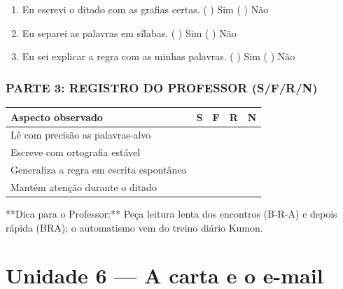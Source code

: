 \begin{exercicio}
\begin{enumerate}[label=\alph*)]
  \item Eu escrevi o ditado com as grafias certas.  \quad ( ) Sim   ( ) Não

  \item Eu separei as palavras em sílabas.  \quad ( ) Sim   ( ) Não

  \item Eu sei explicar a regra com as minhas palavras.  \quad ( ) Sim   ( ) Não

\end{enumerate}

\subsection*{PARTE 3: REGISTRO DO PROFESSOR (S/F/R/N)}

\begin{center}
\renewcommand{\arraystretch}{1.4}
\begin{tabular}{@{}p{9cm}cccc@{}}
\toprule
Aspecto observado & S & F & R & N \\
\midrule
Lê com precisão as palavras-alvo & & & & \\
Escreve com ortografia estável & & & & \\
Generaliza a regra em escrita espontânea & & & & \\
Mantém atenção durante o ditado & & & & \\
\bottomrule\end{tabular}\end{center}

\end{exercicio}

\begin{dica}
**Dica para o Professor:** Peça leitura lenta dos encontros (B-R-A) e depois rápida (BRA); o automatismo vem do treino diário Kumon.
\end{dica}



\chapter{Unidade 6 --- A carta e o e-mail}


